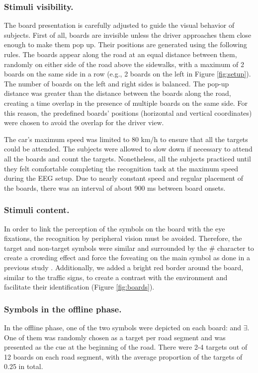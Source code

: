 \documentclass[12pt]{iopart}
\begin{document}
\subsubsection{Stimuli visibility.}
The board presentation is carefully adjusted to guide the visual behavior of subjects.
First of all, boards are invisible unless the driver approaches them
close enough to make them pop up.
Their positions are generated using the following rules.
The boards appear along the road at an equal distance between them, 
randomly on either side of the road above the sidewalks,
with a maximum of 2 boards
on the same side in a row  (e.g., 2 boards on the left in Figure \ref{fig:setup}). The number of boards on the left
and right sides is balanced. The pop-up distance was greater than the distance between the boards along the road, creating a time overlap in the presence of multiple boards on the same side. For this reason, the predefined  boards' positions (horizontal and vertical coordinates) were chosen to avoid the overlap for the driver view.

The car's maximum speed was limited to 80 km/h to ensure 
that all the targets
could be attended. The subjects were allowed to slow down if necessary
to attend all the boards and count the targets.
Nonetheless, all the subjects practiced until they felt comfortable 
completing the recognition task at the maximum speed
during the EEG setup.
Due to nearly constant speed and regular placement of the boards,
there was an interval of about 900 ms between board onsets.

\subsubsection{Stimuli content.} In order to link the perception of the symbols on the board
with the eye fixations, the recognition by
peripheral vision must be avoided. Therefore, the target and non-target
symbols were similar and surrounded by the \# character to create
a crowding effect and force the foveating on the main symbol
as done in a previous study \cite{kamienkowski_fixation-related_2012}.
Additionally, we added a bright red border around the board, similar 
to the traffic signs,
to create a contrast with the environment and facilitate
their identification (Figure \ref{fig:boards}).

\subsubsection*{Symbols in the offline phase.}
In the offline phase, one of the two symbols were depicted on each board:
  and $\exists$.
One of them was randomly chosen as a target per road segment
and was presented as the cue
at the beginning of the road. There were 2-4 targets out of 12 boards
on each road segment, with the average proportion of the targets of 0.25 in total.
\end{document}
